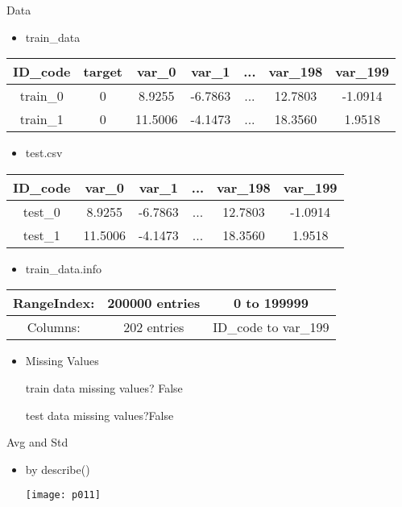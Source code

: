 \documentclass[
 size=12pt,
 paper=smartboard, %
 mode=present, %
 display=slides, %
style=tuliplab,
pauseslide,
fleqn,leqno]{powerdot}
\begin{document}
\begin{slide}{Data}
\begin{itemize}
    \item train_data
\end{itemize}

\begin{tabular}{|c|c|c|c|c|c|c|}%

ID_code&target&var_0&var_1&...&var_198&var_199\\%
 \hline
train_0&0&8.9255 &-6.7863 &...  & 12.7803 & -1.0914  \\
 \hline
train_1&0&11.5006& -4.1473 &...  &18.3560  &   1.9518\\
\end{tabular}
\begin{itemize}
\item test.csv
\end{itemize}

\begin{tabular}{|c|c|c|c|c|c|}%

ID_code&var_0&var_1&...&var_198&var_199\\%
 \hline
test_0&8.9255 &-6.7863 &...  & 12.7803 & -1.0914  \\
 \hline
test_1&11.5006& -4.1473 &...  &18.3560  &   1.9518\\
\end{tabular}
\begin{itemize}
\item train_data.info
\end{itemize}

\begin{tabular}{|c|c|c|}%
 \hline
RangeIndex:&200000 entries&0 to 199999  \\
 \hline
Columns:&202 entries&ID_code to var_199\\

\end{tabular}
\begin{itemize}
\item Missing Values
\par
train data missing values? False
\par
test data missing values?False
\end{itemize}
\end{slide}

\begin{slide}{Avg and Std }
\begin{itemize}
\item by describe()
\par
\texttt{[image: p011]}

\end{itemize}
\end{slide}
\end{document}
